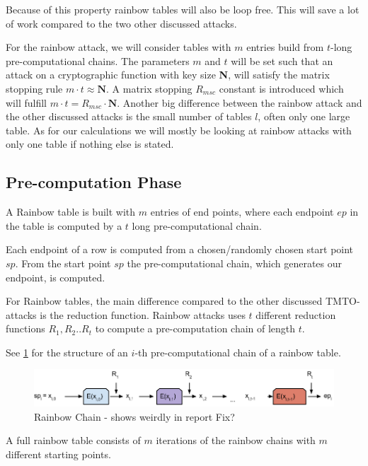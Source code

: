 Because of this property rainbow tables will also be loop free. This
will save a lot of work compared to the two other discussed attacks.

For the rainbow attack, we will consider tables with $m$ entries build
from $t$-long pre-computational chains. The parameters $m$ and $t$
will be set such that an attack on a cryptographic
function with key size \textbf{N}, will satisfy the matrix
stopping rule $m \cdot t \approx \textbf{N}$. A matrix stopping $R_{msc}$
constant is introduced which will fulfill $m\cdot t = R_{msc} \cdot
\textbf{N}$. Another big difference between the rainbow attack and the
other discussed attacks is the small number of tables $l$, often only
one large table. As for our calculations we will mostly be looking at
rainbow attacks with only one table if nothing else is stated.

\subsection{Pre-computation Phase}

A Rainbow table is built with $m$ entries of end points, where each endpoint
$ep$ in the table is computed by a $t$ long pre-computational chain.

Each endpoint of a row is computed from a chosen/randomly chosen
start point $sp$. From the start point $sp$ the pre-computational chain,
which generates our endpoint, is computed.

For Rainbow tables, the main difference compared to the other
discussed TMTO-attacks is the reduction function. Rainbow attacks
uses $t$ different reduction functions $R_1,R_2..R_t$ to compute a pre-computation
chain of length $t$.

See \ref{fig:rainbowchain} for the structure of an $i$-th
pre-computational chain of a rainbow table.

\begin{figure}[H]
  \centering
  \includegraphics[scale=0.4]{figures/rainbowchain.png}
  \caption{Rainbow Chain - shows weirdly in report Fix?}
  \label{fig:rainbowchain}
\end{figure}

A full rainbow table consists of $m$ iterations of the rainbow chains
with $m$ different starting points.

